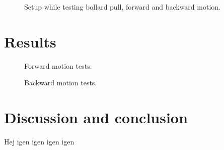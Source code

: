\begin{figure}[htbp]
	\centering
	
	\caption{Setup while testing bollard pull, forward and backward motion.}
	\label{fig:bollpullsetup}
\end{figure}


\section{Results}
\begin{figure}[htbp]
	\centering
	
	\caption{Forward motion tests.}
	\label{fig:bollpullforward}
\end{figure}

\begin{figure}[htbp]
	\centering
	
	\caption{Backward motion tests.}
	\label{fig:bollpullbackward}
\end{figure}

\section{Discussion and conclusion}
Hej igen igen igen igen
